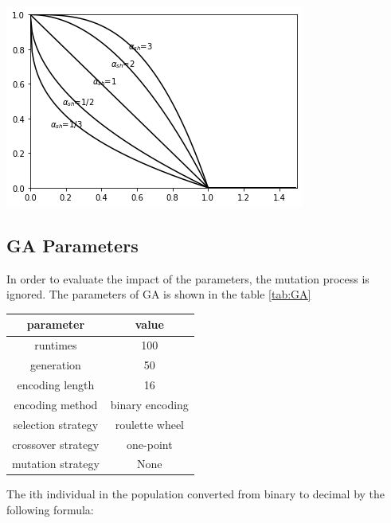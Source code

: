 \documentclass[smallextended]{svjour3}       %
\begin{document}
\begin{multicols}{2}
\begin{center}
  \includegraphics[width=\linewidth]{GA_images/share-function.png}
  \label{fig:share}
\end{center}



\subsection{GA Parameters}

In order to evaluate the impact of the parameters, the mutation process is
ignored. The parameters of GA is shown in the table \ref{tab:GA}

\begin{center}
\begin{tabular}{cc}
	\toprule
	parameter & value \\
	\midrule
    runtimes             & 100 \\
	generation           & 50 \\
    encoding length      & 16 \\
    encoding method      & binary encoding\\
	selection strategy   & roulette wheel  \\
	crossover strategy   & one-point \\
	mutation strategy    & None \\
	\bottomrule
\end{tabular}
\label{tab:GA}
\end{center}



The ith individual in the population converted  from binary to decimal by the
following formula:


\end{multicols}
\end{document}
